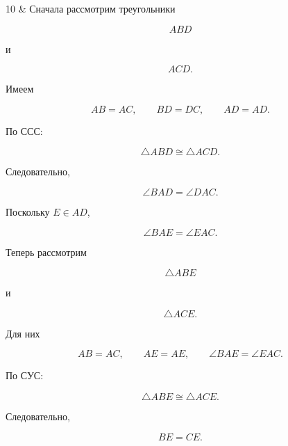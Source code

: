 \documentclass[a4paper,12pt]{article}
\begin{document}
\begin{longtable}
10
&
Сначала рассмотрим треугольники

\[
ABD
\]

и

\[
ACD.
\]

Имеем

\[
AB=AC,
\qquad
BD=DC,
\qquad
AD=AD.
\]

По ССС:

\[
\triangle ABD\cong\triangle ACD.
\]

Следовательно,

\[
\angle BAD=\angle DAC.
\]

Поскольку $E\in AD$,

\[
\angle BAE=\angle EAC.
\]

Теперь рассмотрим

\[
\triangle ABE
\]

и

\[
\triangle ACE.
\]

Для них

\[
AB=AC,
\qquad
AE=AE,
\qquad
\angle BAE=\angle EAC.
\]

По СУС:

\[
\triangle ABE\cong\triangle ACE.
\]

Следовательно,

\[
BE=CE.
\]
\\

\end{longtable}

\normalsize
\end{document}
